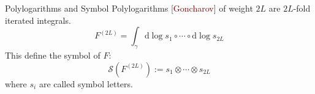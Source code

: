 \documentclass[10pt]{beamer}
\begin{document}
\begin{frame}{Polylogarithms and Symbol}
Polylogarithms [\textcolor{darkred}{Goncharov}] of weight $2L$ are $2L$-fold iterated integrals.
\begin{equation*}
   F^{(2L)} = \int_{\gamma} \mathrm{d}\log s_{1} \circ\cdots\circ \mathrm{d}\log s_{2L} 
\end{equation*}
This define the \alert{symbol} of $F$:
\begin{equation*}
  \mathcal{S}(F^{(2L)}):= s_{1}\otimes \cdots \otimes s_{2L}
\end{equation*}
where $s_{i}$ are called \alert{symbol letters}.


\end{frame}
\end{document}
